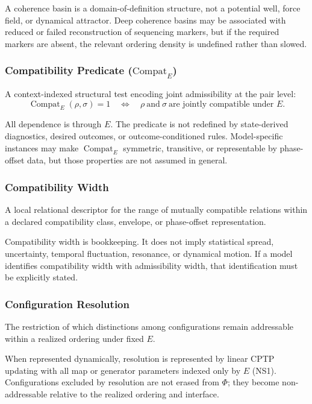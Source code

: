 \documentclass[aps,prx,onecolumn,11pt]{revtex4-2}
\theoremstyle{plain}
\theoremstyle{definition}
\theoremstyle{remark}
\newcommand{\Compat}{\operatorname{Compat}} %
\begin{document}
A coherence basin is a domain-of-definition structure, not a potential
well, force field, or dynamical attractor. Deep coherence basins may be
associated with reduced or failed reconstruction of sequencing markers,
but if the required markers are absent, the relevant ordering density is
undefined rather than slowed.

\subsubsection*{Compatibility Predicate (\texorpdfstring{\(\mathrm{Compat}_E\)}{CompatE})}
\label{gloss:compatibility_predicate}

A context-indexed structural test encoding joint admissibility at the
pair level:
\[
\Compat_E(\rho,\sigma)=1
\quad\Longleftrightarrow\quad
\rho\ \text{and}\ \sigma
\ \text{are jointly compatible under }E.
\]

All dependence is through \(E\). The predicate is not redefined by
state-derived diagnostics, desired outcomes, or outcome-conditioned
rules. Model-specific instances may make \(\Compat_E\) symmetric,
transitive, or representable by phase-offset data, but those properties
are not assumed in general.

\subsubsection*{Compatibility Width}

A local relational descriptor for the range of mutually compatible
relations within a declared compatibility class, envelope, or
phase-offset representation.

Compatibility width is bookkeeping. It does not imply statistical
spread, uncertainty, temporal fluctuation, resonance, or dynamical
motion. If a model identifies compatibility width with admissibility
width, that identification must be explicitly stated.

\subsubsection*{Configuration Resolution}
\label{gloss:configuration_resolution}

The restriction of which distinctions among configurations remain
addressable within a realized ordering under fixed \(E\).

When represented dynamically, resolution is represented by linear CPTP
updating with all map or generator parameters indexed only by \(E\)
(NS1). Configurations excluded by resolution are not erased from
\(\Phi\); they become non-addressable relative to the realized ordering
and interface.
\end{document}
